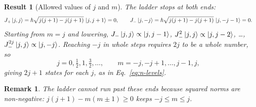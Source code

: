 \documentclass{article}
\newtheorem{remark}{Remark}
\newtheorem{result}{Result}
\begin{document}
\begin{result}[Allowed values of $j$ and $m$]
    The ladder stops at both ends:
    \[J_+\ket{j,j} = \hbar\sqrt{j(j+1) - j(j+1)}\,\ket{j,j+1} = 0, \qquad J_-\ket{j,-j} = \hbar\sqrt{j(j+1) - j(j+1)}\,\ket{j,-j-1} = 0.\]
    Starting from $m = j$ and lowering, $J_-\ket{j,j} \propto \ket{j,j-1}$, $J_-^2\ket{j,j} \propto \ket{j,j-2}$, \dots, $J_-^{2j}\ket{j,j} \propto \ket{j,-j}$. Reaching $-j$ in whole steps requires $2j$ to be a whole number, so
    \begin{equation}
        j = 0, \tfrac12, 1, \tfrac32, \dots, \qquad m = -j, -j+1, \dots, j-1, j,
    \end{equation}
    giving $2j+1$ states for each $j$, as in Eq.~\eqref{eq:n-levels}.
\end{result}
\begin{remark}
    The ladder cannot run past these ends because squared norms are non-negative: $j(j+1) - m(m\pm1) \geq 0$ keeps $-j \leq m \leq j$.
\end{remark}
\end{document}
